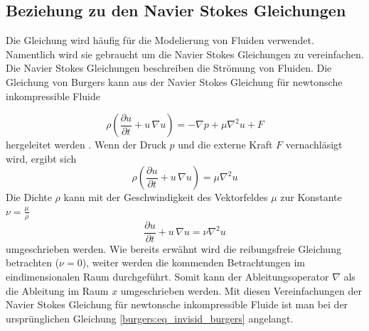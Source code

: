 	\subsection{Beziehung zu den Navier Stokes Gleichungen}
		Die Gleichung wird häufig für die Modelierung von Fluiden verwendet.
		Namentlich wird sie gebraucht um die Navier Stokes Gleichungen zu vereinfachen.
		Die Navier Stokes Gleichungen beschreiben die Str\"omung von Fluiden.
		Die Gleichung von Burgers kann aus der Navier Stokes Gleichung f\"ur newtonsche inkompressible Fluide

		\begin{equation}
			\rho \left(\frac{\partial u}{\partial t} + u \, \nabla u \right) = -\nabla p + \mu \nabla^2 u + F
			\label{burgers:eq_navier}
		\end{equation}
		hergeleitet werden \cite{burgers:navier}.
		Wenn der Druck $p$ und die externe Kraft $F$ vernachl\"asigt wird, ergibt sich
		\begin{equation}
			\rho \left(\frac{\partial u}{\partial t} + u \, \nabla u \right) = \mu \nabla^2 u
			 \label{burgers:eq_navier2}
		\end{equation}
		Die Dichte $\rho$ kann mit der Geschwindigkeit des Vektorfeldes $\mu$ zur Konstante $\nu = \frac{\mu}{\rho}$
		\begin{equation}
			 \frac{\partial u}{\partial t} + u \,\nabla u = \nu \nabla^2 u
			 \label{burgers:eq_navier3}
		\end{equation}
		umgeschrieben werden.
		Wie bereits erw\"ahnt wird die reibungsfreie Gleichung betrachten ($\nu = 0$), weiter werden die kommenden Betrachtungen im eindimensionalen Raum durchgef\"uhrt.
		Somit kann der Ableitungsoperator $\nabla$ als die Ableitung im Raum $x$ umgeschrieben werden.
		Mit diesen Vereinfachungen der Navier Stokes Gleichung f\"ur newtonsche inkompressible Fluide ist man bei der urspr\"unglichen Gleichung \eqref{burgers:eq_invisid_burgers} angelangt.

